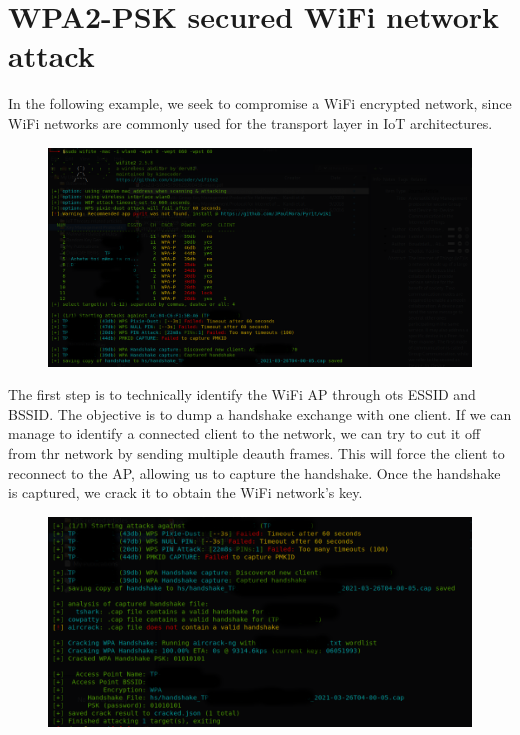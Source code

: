 \chapter{WPA2-PSK secured WiFi network attack}
\label{app:wifi_attack}

In the following example, we seek to compromise a WiFi encrypted network, since WiFi networks are commonly used for the transport layer in IoT architectures.

\begin{figure}[htbp]
	\centerline{\includegraphics[scale=0.25]{figures/wifi/wifite1bis.png}}
	\label{fig}
\end{figure}

The first step is to technically identify the WiFi AP through ots ESSID and BSSID. The objective is to dump a handshake exchange with one client. If we can manage to identify a connected client to the network, we can try to cut it off from thr network by sending multiple deauth frames. This will force the client to reconnect to the AP, allowing us to capture the handshake. Once the handshake is captured, we crack it to obtain the WiFi network’s key.

\begin{figure}[htbp]
	\centerline{\includegraphics[scale=0.35]{figures/wifi/wifite2bis.png}}
	\label{fig}
\end{figure}

